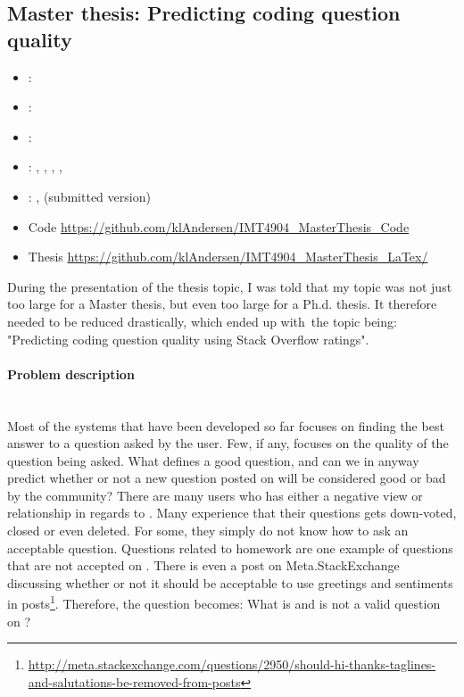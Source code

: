 \subsection{Master thesis: Predicting coding question quality}
\label{sec:master_thesis}
\begin{itemize} 
	\item {}: 
	\item {}: 
	\item {}: 
	\item {}: , , , , 
	\item {}: ,  (submitted version)
	\item Code  \url{https://github.com/klAndersen/IMT4904_MasterThesis_Code}
	\item Thesis  \url{https://github.com/klAndersen/IMT4904_MasterThesis_LaTex/}
\end{itemize} 
During the presentation of the thesis topic, I was told that my topic was not just too large for a Master thesis, but even too large for a Ph.d. thesis. 
It therefore needed to be reduced drastically, which ended up with the topic being: "Predicting coding question quality using Stack Overflow ratings". 

\paragraph{Problem description} ~\\
Most of the systems that have been developed so far focuses on finding the best answer to a question asked by the user. 
Few, if any, focuses on the quality of the question being asked. 
What defines a good question, and can we in anyway predict whether or not a new question posted on  will be considered good or bad by the community?
There are many users who has either a negative view or relationship in regards to .
Many experience that their questions gets down-voted, closed or even deleted. 
For some, they simply do not know how to ask an acceptable question.
Questions related to homework are one example of questions that are not accepted on .
There is even a post on Meta.StackExchange discussing whether or not it should be acceptable to use greetings and sentiments in posts\footnote{
	\url{http://meta.stackexchange.com/questions/2950/should-hi-thanks-taglines-and-salutations-be-removed-from-posts}
}.
Therefore, the question becomes: What is and is not a valid question on ?

